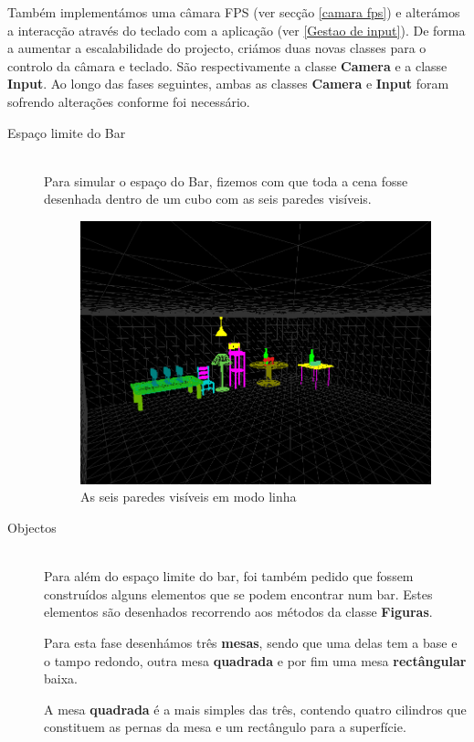 \documentclass[a5paper,onecolumn, 11pt]{article}
\begin{document}
Também implementámos uma câmara FPS (ver secção \ref{camara fps}) e alterámos a interacção através do teclado com a aplicação (ver \ref{Gestao de input}). De forma a aumentar a escalabilidade do projecto, criámos duas novas classes para o controlo da câmara e teclado. São respectivamente a classe \textbf{Camera} e a classe \textbf{Input}. Ao longo das fases seguintes, ambas as classes \textbf{Camera} e \textbf{Input} foram sofrendo alterações conforme foi necessário.
\newpage
\begin{description}
	\item[Espaço limite do Bar] \hfill \\
	Para simular o espaço do Bar, fizemos com que toda a cena fosse desenhada dentro de um cubo com as seis paredes visíveis.
\begin{figure}[h!b!t!]
	\centering
	\includegraphics[scale=0.4]{paredes.png}
	\caption{As seis paredes visíveis em modo linha}
\end{figure}
\newpage
\item[Objectos] \hfill \\
Para além do espaço limite do bar, foi também pedido que fossem construídos alguns elementos que se podem encontrar num bar. Estes elementos são desenhados recorrendo aos métodos da classe \textbf{Figuras}.

Para esta fase desenhámos três \textbf{mesas}, sendo que uma delas tem a base e o tampo redondo, outra mesa \textbf{quadrada} e por fim uma mesa \textbf{rectângular} baixa.

A mesa \textbf{quadrada} é a mais simples das três, contendo quatro cilindros que constituem as pernas da mesa e um rectângulo para a superfície.


\end{description}
\end{document}
